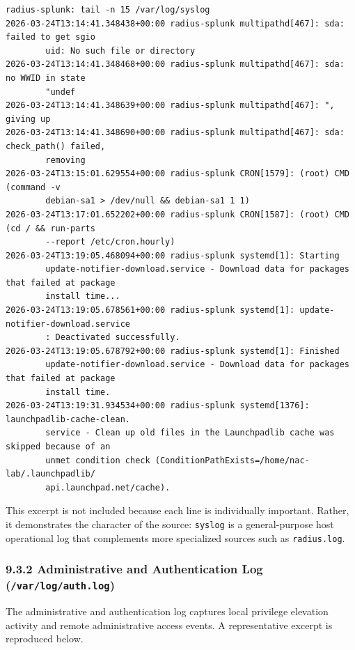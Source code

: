 \documentclass[11pt]{article}
\begin{document}
\begin{verbatim}
radius-splunk: tail -n 15 /var/log/syslog
2026-03-24T13:14:41.348438+00:00 radius-splunk multipathd[467]: sda: failed to get sgio 
        uid: No such file or directory
2026-03-24T13:14:41.348468+00:00 radius-splunk multipathd[467]: sda: no WWID in state 
        "undef
2026-03-24T13:14:41.348639+00:00 radius-splunk multipathd[467]: ", giving up
2026-03-24T13:14:41.348690+00:00 radius-splunk multipathd[467]: sda: check_path() failed, 
        removing
2026-03-24T13:15:01.629554+00:00 radius-splunk CRON[1579]: (root) CMD (command -v 
        debian-sa1 > /dev/null && debian-sa1 1 1)
2026-03-24T13:17:01.652202+00:00 radius-splunk CRON[1587]: (root) CMD (cd / && run-parts 
        --report /etc/cron.hourly)
2026-03-24T13:19:05.468094+00:00 radius-splunk systemd[1]: Starting 
        update-notifier-download.service - Download data for packages that failed at package 
        install time...
2026-03-24T13:19:05.678561+00:00 radius-splunk systemd[1]: update-notifier-download.service
        : Deactivated successfully.
2026-03-24T13:19:05.678792+00:00 radius-splunk systemd[1]: Finished 
        update-notifier-download.service - Download data for packages that failed at package 
        install time.
2026-03-24T13:19:31.934534+00:00 radius-splunk systemd[1376]: launchpadlib-cache-clean.
        service - Clean up old files in the Launchpadlib cache was skipped because of an
        unmet condition check (ConditionPathExists=/home/nac-lab/.launchpadlib/
        api.launchpad.net/cache).
\end{verbatim}

This excerpt is not included because each line is individually important. Rather, it demonstrates the character of the source: \texttt{syslog} is a general-purpose host operational log that complements more specialized sources such as \texttt{radius.log}.

\subsubsection{9.3.2 Administrative and Authentication Log (\texttt{/var/log/auth.log})}
\label{sec:administrative-and-authentication-log-auth-log}

The administrative and authentication log captures local privilege elevation activity and remote administrative access events. A representative excerpt is reproduced below.
\end{document}
